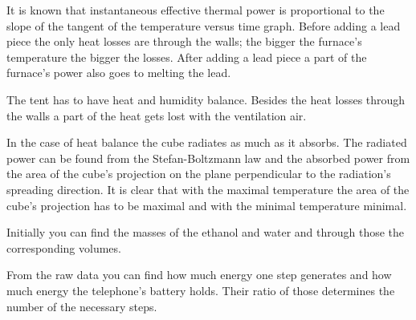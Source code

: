 \documentclass[11pt]{article}
\begin{document}

\hinteng
It is known that instantaneous effective thermal power is proportional to the slope of the tangent of the temperature versus time graph. Before adding a lead piece the only heat losses are through the walls; the bigger the furnace’s temperature the bigger the losses. After adding a lead piece a part of the furnace’s power also goes to melting the lead.
\probend
\bigskip


\hinteng
The tent has to have heat and humidity balance. Besides the heat losses through the walls a part of the heat gets lost with the ventilation air.
\probend
\bigskip


\hinteng
In the case of heat balance the cube radiates as much as it absorbs. The radiated power can be found from the Stefan-Boltzmann law and the absorbed power from the area of the cube’s projection on the plane perpendicular to the radiation’s spreading direction. It is clear that with the maximal temperature the area of the cube’s projection has to be maximal and with the minimal temperature minimal.
\probend
\bigskip


\hinteng
Initially you can find the masses of the ethanol and water and through those the corresponding volumes.
\probend
\bigskip


\hinteng
From the raw data you can find how much energy one step generates and how much energy the telephone’s battery holds. Their ratio of those determines the number of the necessary steps.
\probend
\bigskip

\end{document}
